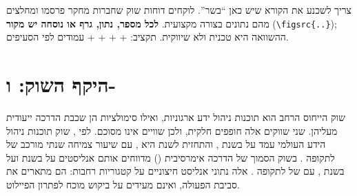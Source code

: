 \begin{pcguide}
צריך לשכנע את הקורא שיש כאן “בשר”. לוקחים דוחות שוק שחברות מחקר פרסמו ומחלצים מהם נתונים בצורה מקצועית.
\textbf{לכל מספר, נתון, גרף או נוסחה יש מקור} (\texttt{\textbackslash{}figsrc\{..\}}); ההשוואה היא טכנית ולא שיווקית.
תקציב:  +  +  +  +  עמודים לפי הסעיפים.
\end{pcguide}

\section{היקף השוק:  ו-}\label{sec:tam}
שוק הייחוס הרחב הוא תוכנות ניהול ידע ארגוניות, ואילו סימולציות  הן שכבת הדרכה ייעודית מעליהן. שני שווקים אלה
חופפים חלקית, ולכן שוויים אינו מסוכם. לפי , שוק תוכנות ניהול הידע העולמי עמד על 
בשנת , והתחזית לשנת  היא , עם שיעור צמיחה שנתי מורכב  של 
לתקופה  \cite{gvr2025market}. בשוק הסמוך של הדרכה אימרסיבית () מדווחים אותם אנליסטים על
 בשנת  ועל  בשנת , עם  של  לתקופה 
\cite{gvr2025immersive}. אלה נתוני אנליסט חיצוניים על קטגוריות רחבות: הם מתארים את סביבת הפעולה, ואינם מעידים
על ביקוש מוכח לפתרון הפיילוט.

